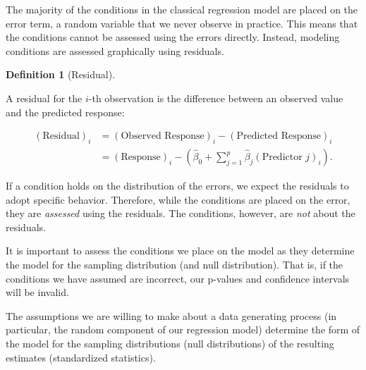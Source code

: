 \documentclass[
  letterpaper,
  DIV=11,
  numbers=noendperiod]{scrreprt}
\theoremstyle{definition}
\theoremstyle{definition}
\newtheorem{definition}{Definition}[chapter]
\theoremstyle{remark}
\begin{document}
The majority of the conditions in the classical regression model are
placed on the error term, a random variable that we never observe in
practice. This means that the conditions cannot be assessed using the
errors directly. Instead, modeling conditions are assessed graphically
using residuals.

\begin{definition}[Residual]\protect\hypertarget{def-residual}{}\label{def-residual}

A residual for the \(i\)-th observation is the difference between an
observed value and the predicted response:

\[
\begin{aligned}
  (\text{Residual})_i 
    &= (\text{Observed Response})_i - (\text{Predicted Response})_i \\
    &= (\text{Response})_i - \left(\widehat{\beta}_0 + \sum_{j=1}^{p} \widehat{\beta}_j (\text{Predictor } j)_i\right).
\end{aligned}
\]

\end{definition}

\begin{tcolorbox}[enhanced jigsaw, bottomrule=.15mm, titlerule=0mm, bottomtitle=1mm, colback=white, coltitle=black, rightrule=.15mm, leftrule=.75mm, toprule=.15mm, toptitle=1mm, left=2mm, opacityback=0, colframe=quarto-callout-tip-color-frame, breakable, title=\textcolor{quarto-callout-tip-color}{\faLightbulb}\hspace{0.5em}{Big Idea}, arc=.35mm, colbacktitle=quarto-callout-tip-color!10!white, opacitybacktitle=0.6]

If a condition holds on the distribution of the errors, we expect the
residuals to adopt specific behavior. Therefore, while the conditions
are placed on the error, they are \emph{assessed} using the residuals.
The conditions, however, are \emph{not} about the residuals.

\end{tcolorbox}

It is important to assess the conditions we place on the model as they
determine the model for the sampling distribution (and null
distribution). That is, if the conditions we have assumed are incorrect,
our p-values and confidence intervals will be invalid.

\begin{tcolorbox}[enhanced jigsaw, bottomrule=.15mm, titlerule=0mm, bottomtitle=1mm, colback=white, coltitle=black, rightrule=.15mm, leftrule=.75mm, toprule=.15mm, toptitle=1mm, left=2mm, opacityback=0, colframe=quarto-callout-tip-color-frame, breakable, title=\textcolor{quarto-callout-tip-color}{\faLightbulb}\hspace{0.5em}{Big Idea}, arc=.35mm, colbacktitle=quarto-callout-tip-color!10!white, opacitybacktitle=0.6]

The assumptions we are willing to make about a data generating process
(in particular, the random component of our regression model) determine
the form of the model for the sampling distributions (null
distributions) of the resulting estimates (standardized statistics).

\end{tcolorbox}
\end{document}

